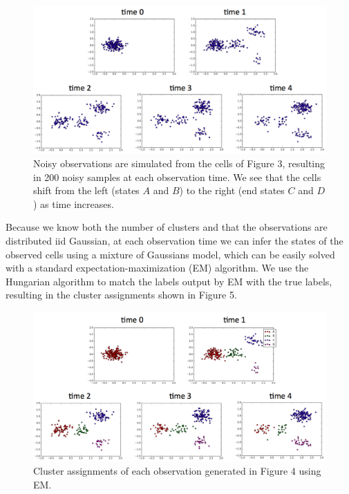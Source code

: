 \documentclass[11pt,onecolumn]{article}
\begin{document}
\begin{figure}[!htb]
		\captionsetup{width=.8\linewidth}
		\caption{Noisy observations are simulated from the cells of Figure 3, resulting in 200 noisy samples at each observation time. We see that the cells shift from the left (states $A$ and $B$) to the right (end states $C$ and $D$) as time increases.}
		\centering
		\includegraphics[scale=0.25]{Fig3.png}
\end{figure}

Because we know both the number of clusters and that the observations are distributed iid Gaussian, at each observation time we can infer the states of the observed cells using a mixture of Gaussians model, which can be easily solved with a standard expectation-maximization (EM) algorithm. We use the Hungarian algorithm to match the labels output by EM with the true labels, resulting in the cluster assignments shown in Figure 5. \\

\begin{figure}[!htb]
		\captionsetup{width=.8\linewidth}
		\caption{Cluster assignments of each observation generated in Figure 4 using EM.}
		\centering
		\includegraphics[scale=0.25]{Fig4.png}
\end{figure}
\end{document}
